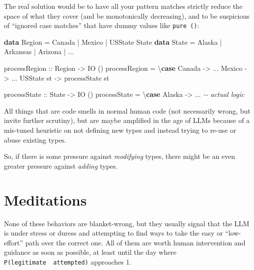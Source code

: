 \documentclass[]{article}
\newenvironment{Shaded}{}{}
\newcommand{\CommentTok}[1]{\textcolor[rgb]{0.38,0.63,0.69}{\textit{#1}}}
\newcommand{\DataTypeTok}[1]{\textcolor[rgb]{0.56,0.13,0.00}{#1}}
\newcommand{\KeywordTok}[1]{\textcolor[rgb]{0.00,0.44,0.13}{\textbf{#1}}}
\newcommand{\NormalTok}[1]{#1}
\newcommand{\OperatorTok}[1]{\textcolor[rgb]{0.40,0.40,0.40}{#1}}
\newcommand{\OtherTok}[1]{\textcolor[rgb]{0.00,0.44,0.13}{#1}}
\begin{document}
The real solution would be to have all your pattern matches strictly reduce the
space of what they cover (and be monotonically decreasing), and to be suspicious
of ``ignored case matches'' that have dummy values like \texttt{pure\ ()}:

\begin{Shaded}
\begin{Highlighting}[]
\KeywordTok{data} \DataTypeTok{Region} \OtherTok{=} \DataTypeTok{Canada} \OperatorTok{|} \DataTypeTok{Mexico} \OperatorTok{|} \DataTypeTok{USState} \DataTypeTok{State}
\KeywordTok{data} \DataTypeTok{State} \OtherTok{=} \DataTypeTok{Alaska} \OperatorTok{|} \DataTypeTok{Arkansas} \OperatorTok{|} \DataTypeTok{Arizona} \OperatorTok{|} \OperatorTok{...}

\OtherTok{processRegion ::} \DataTypeTok{Region} \OtherTok{{-}\textgreater{}} \DataTypeTok{IO}\NormalTok{ ()}
\NormalTok{processRegion }\OtherTok{=}\NormalTok{ \textbackslash{}}\KeywordTok{case}
    \DataTypeTok{Canada} \OtherTok{{-}\textgreater{}} \OperatorTok{...}
    \DataTypeTok{Mexico} \OtherTok{{-}\textgreater{}} \OperatorTok{...}
    \DataTypeTok{USState}\NormalTok{ st }\OtherTok{{-}\textgreater{}}\NormalTok{ processState st}

\OtherTok{processState ::} \DataTypeTok{State} \OtherTok{{-}\textgreater{}} \DataTypeTok{IO}\NormalTok{ ()}
\NormalTok{processState }\OtherTok{=}\NormalTok{ \textbackslash{}}\KeywordTok{case}
    \DataTypeTok{Alaska} \OtherTok{{-}\textgreater{}} \OperatorTok{...} \CommentTok{{-}{-} actual logic}
\end{Highlighting}
\end{Shaded}

All things that are code smells in normal human code (not necessarily wrong, but
invite further scrutiny), but are maybe amplified in the age of LLMs because of
a mis-tuned heuristic on not defining new types and instead trying to re-use or
abuse existing types.

So, if there is some pressure against \emph{modifying} types, there might be an
even greater pressure against \emph{adding} types.

\section{Meditations}\label{meditations}

None of these behaviors are blanket-wrong, but they usually signal that the LLM
is under stress or duress and attempting to find ways to take the easy or
``low-effort'' path over the correct one. All of them are worth human
intervention and guidance as soon as possible, at least until the day where
\texttt{P(legitimate\ \textbar{}\ attempted)} approaches 1.
\end{document}
